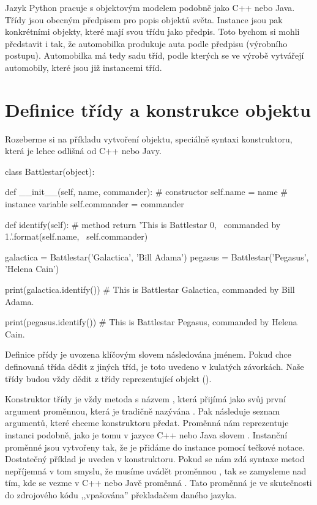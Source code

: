 Jazyk Python pracuje s objektovým modelem podobně jako C++ nebo Java. Třídy jsou obecným předpisem pro
popis objektů světa. Instance jsou pak konkrétními objekty, které mají svou třídu jako předpis.
Toto bychom si mohli představit i tak, že automobilka produkuje auta podle předpisu (výrobního postupu).
Automobilka má tedy sadu tříd, podle kterých se ve výrobě vytvářejí automobily, které jsou již instancemi
tříd.


\section{Definice třídy a konstrukce objektu}

Rozeberme si na příkladu vytvoření objektu, speciálně syntaxi konstruktoru, která je lehce odlišná
od C++ nebo Javy.

\begin{python}
class Battlestar(object):
    
    def __init__(self, name, commander): # constructor
        self.name = name                 # instance variable
        self.commander = commander

    def identify(self):                  # method
        return 'This is Battlestar {0}, \
                commanded by {1}.'.format(self.name, \
                self.commander)

galactica = Battlestar('Galactica', 'Bill Adama')
pegasus = Battlestar('Pegasus', 'Helena Cain')

print(galactica.identify())
# This is Battlestar Galactica, commanded by Bill Adama.

print(pegasus.identify())
# This is Battlestar Pegasus, commanded by Helena Cain.
\end{python}

    Definice přídy je uvozena klíčovým slovem  následována jménem.
Pokud chce definovaná třída
dědit z jiných tříd, je toto uvedeno v kulatých závorkách. Naše třídy budou vždy dědit z třídy reprezentující
objekt (\kod{object}).

Konstruktor třídy je vždy metoda s názvem ,
která přijímá jako svůj první argument proměnnou,
která je tradičně nazývána \index{self}.
Pak následuje seznam argumentů, které chceme konstruktoru předat.
Proměnná \kod{self} nám reprezentuje instanci podobně, jako je tomu v jazyce C++ nebo Java slovem .
Instanční proměnné jsou vytvořeny tak, že je přidáme do instance pomocí tečkové notace. Dostatečný příklad
je uveden v konstruktoru.
Pokud se nám zdá syntaxe metod nepříjemná v tom smyslu, že musíme uvádět proměnnou \kod{self}, tak se
zamysleme nad tím, kde se vezme v C++ nebo Javě proměnná . Tato proměnná je ve skutečnosti
do zdrojového kódu ,,vpašována'' překladačem daného jazyka.

